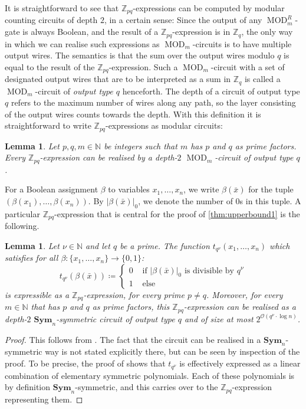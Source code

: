 \documentclass[11pt]{article}
\DeclareMathOperator{\MOD}{MOD}
\newcommand{\Sym}{\mathbf{Sym}}
\newcommand{\bbN}{\mathbb{N}}
\newcommand{\bbZ}{\mathbb{Z}}
\newcommand{\Oo}{{\mathcal O}}
\theoremstyle{definition}
\theoremstyle{plain}
\newtheorem{lemma}[definition]{Lemma}
\theoremstyle{remark}
\theoremstyle{remark}
\begin{document}
It is straightforward to see that $\bbZ_{pq}$-expressions can be computed by modular counting circuits of depth $2$, in a certain sense:
Since the output of any $\MOD_m^R$-gate is always Boolean, and the result of a $\bbZ_{pq}$-expression is in $\bbZ_q$, the only way in which we can realise such expressions as $\MOD_m$-circuits is to have multiple output wires. The semantics is that the sum over the output wires modulo $q$ is equal to the result of the $\bbZ_{pq}$-expression. Such a $\MOD_m$-circuit with a set of designated output wires that are to be interpreted as a sum in $\bbZ_q$ is called a $\MOD_m$-circuit of \emph{output type $q$} henceforth.
The depth of a circuit of output type $q$ refers to the maximum number of wires along any path, so the layer consisting of the output wires counts towards the depth.
With this definition it is straightforward to write $\bbZ_{pq}$-expressions as modular circuits:
\begin{lemma}
	\label{lem:fromExpressionsToCircuits}
	Let $p,q,m \in \bbN$ be integers such that $m$ has $p$ and $q$ as prime factors. Every $\bbZ_{pq}$-expression can be realised by a depth-$2$ $\MOD_m$-circuit of output type $q$.
\end{lemma}	
\noindent
For a Boolean assignment $\beta$ to variables $x_1, \dots, x_n$, we write $\beta(\bar{x})$ for the tuple $(\beta(x_1), \dots, \beta(x_n))$. By $|\beta(\bar{x})|_0$, we denote the number of $0$s in this tuple. 
A particular $\bbZ_{pq}$-expression that is central for the proof of \cref{thm:upperbound1} is the following.
\begin{lemma}
	\label{lem:symmetricCircuitsForZpqExpressions}
	Let $\nu \in \bbN$ and let $q$ be a prime.
	The function $t_{q^\nu}(x_1, \dots, x_n)$ which satisfies for all $\beta \colon \{x_1, \dots, x_n\} \to \{0,1\}$:
	\[
	t_{q^\nu}(\beta(\bar{x})) \coloneqq \begin{cases}
												0 & \text{ if } |\beta(\bar{x})|_0  \text{ is divisible by } q^\nu\\
												1 & \text{ else}
		\end{cases}
	\]
	is expressible as a $\bbZ_{pq}$-expression, for every prime $p \neq q$.
	Moreover, for every $m \in \bbN$ that has $p$ and $q$ as prime factors, this $\bbZ_{pq}$-expression can be realised as a depth-$2$ $\Sym_n$-symmetric circuit of output type $q$ and of size at most $2^{\Oo(q^\nu \cdot \log n)}$.
\end{lemma}	
\begin{proof}
	This follows from \cite[Lemma 3.5]{IdziakKK22LICS}. The fact that the circuit can be realised in a $\Sym_n$-symmetric way is not stated explicitly there, but can be seen by inspection of the proof.
	To be precise, the proof of \cite[Fact 3.4]{IdziakKK22LICS} shows that $t_{q^\nu}$ is effectively expressed as a linear combination of elementary symmetric polynomials. Each of these polynomials is by definition $\Sym_n$-symmetric, and this carries over to the $\bbZ_{pq}$-expression representing them.
\end{proof}	
\end{document}
